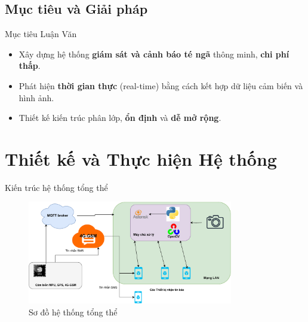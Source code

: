 \subsection{Mục tiêu và Giải pháp}
\begin{frame}{Mục tiêu Luận Văn}
    \begin{itemize}
        \item Xây dựng hệ thống \textbf{giám sát và cảnh báo té ngã} thông minh, \textbf{chi phí thấp}.
        \item Phát hiện \textbf{thời gian thực} (real-time) bằng cách kết hợp dữ liệu cảm biến và hình ảnh.
        \item Thiết kế kiến trúc phân lớp, \textbf{ổn định} và \textbf{dễ mở rộng}.
    \end{itemize}
\end{frame}

\section{Thiết kế và Thực hiện Hệ thống}

\begin{frame}{Kiến trúc hệ thống tổng thể}
    \begin{figure}
        \centering
        \includegraphics[width=0.8\textwidth]{images/resuilt_structure_diagram.pdf}
        \caption{Sơ đồ hệ thống tổng thể}
    \end{figure}
\end{frame}

